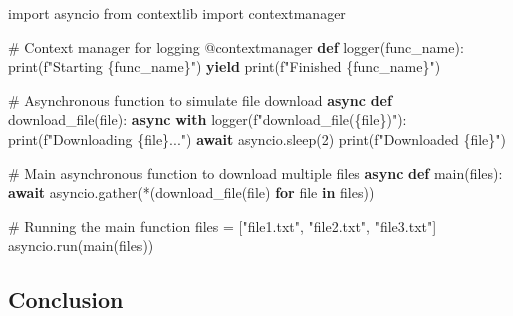 \documentclass[
  letterpaper,
  DIV=11,
  numbers=noendperiod]{scrreprt}
\newenvironment{Shaded}{\begin{snugshade}}{\end{snugshade}}
\newcommand{\AttributeTok}[1]{\textcolor[rgb]{0.40,0.45,0.13}{#1}}
\newcommand{\BuiltInTok}[1]{\textcolor[rgb]{0.00,0.23,0.31}{#1}}
\newcommand{\CommentTok}[1]{\textcolor[rgb]{0.37,0.37,0.37}{#1}}
\newcommand{\ControlFlowTok}[1]{\textcolor[rgb]{0.00,0.23,0.31}{\textbf{#1}}}
\newcommand{\DecValTok}[1]{\textcolor[rgb]{0.68,0.00,0.00}{#1}}
\newcommand{\ImportTok}[1]{\textcolor[rgb]{0.00,0.46,0.62}{#1}}
\newcommand{\KeywordTok}[1]{\textcolor[rgb]{0.00,0.23,0.31}{\textbf{#1}}}
\newcommand{\NormalTok}[1]{\textcolor[rgb]{0.00,0.23,0.31}{#1}}
\newcommand{\OperatorTok}[1]{\textcolor[rgb]{0.37,0.37,0.37}{#1}}
\newcommand{\SpecialCharTok}[1]{\textcolor[rgb]{0.37,0.37,0.37}{#1}}
\newcommand{\SpecialStringTok}[1]{\textcolor[rgb]{0.13,0.47,0.30}{#1}}
\newcommand{\StringTok}[1]{\textcolor[rgb]{0.13,0.47,0.30}{#1}}
\begin{document}
\begin{Shaded}
\begin{Highlighting}[]
\ImportTok{import}\NormalTok{ asyncio}
\ImportTok{from}\NormalTok{ contextlib }\ImportTok{import}\NormalTok{ contextmanager}

\CommentTok{\# Context manager for logging}
\AttributeTok{@contextmanager}
\KeywordTok{def}\NormalTok{ logger(func\_name):}
    \BuiltInTok{print}\NormalTok{(}\SpecialStringTok{f"Starting }\SpecialCharTok{\{}\NormalTok{func\_name}\SpecialCharTok{\}}\SpecialStringTok{"}\NormalTok{)}
    \ControlFlowTok{yield}
    \BuiltInTok{print}\NormalTok{(}\SpecialStringTok{f"Finished }\SpecialCharTok{\{}\NormalTok{func\_name}\SpecialCharTok{\}}\SpecialStringTok{"}\NormalTok{)}

\CommentTok{\# Asynchronous function to simulate file download}
\ControlFlowTok{async} \KeywordTok{def}\NormalTok{ download\_file(}\BuiltInTok{file}\NormalTok{):}
    \ControlFlowTok{async} \ControlFlowTok{with}\NormalTok{ logger(}\SpecialStringTok{f"download\_file(}\SpecialCharTok{\{}\BuiltInTok{file}\SpecialCharTok{\}}\SpecialStringTok{)"}\NormalTok{):}
        \BuiltInTok{print}\NormalTok{(}\SpecialStringTok{f"Downloading }\SpecialCharTok{\{}\BuiltInTok{file}\SpecialCharTok{\}}\SpecialStringTok{..."}\NormalTok{)}
        \ControlFlowTok{await}\NormalTok{ asyncio.sleep(}\DecValTok{2}\NormalTok{)}
        \BuiltInTok{print}\NormalTok{(}\SpecialStringTok{f"Downloaded }\SpecialCharTok{\{}\BuiltInTok{file}\SpecialCharTok{\}}\SpecialStringTok{"}\NormalTok{)}

\CommentTok{\# Main asynchronous function to download multiple files}
\ControlFlowTok{async} \KeywordTok{def}\NormalTok{ main(files):}
    \ControlFlowTok{await}\NormalTok{ asyncio.gather(}\OperatorTok{*}\NormalTok{(download\_file(}\BuiltInTok{file}\NormalTok{) }\ControlFlowTok{for} \BuiltInTok{file} \KeywordTok{in}\NormalTok{ files))}

\CommentTok{\# Running the main function}
\NormalTok{files }\OperatorTok{=}\NormalTok{ [}\StringTok{"file1.txt"}\NormalTok{, }\StringTok{"file2.txt"}\NormalTok{, }\StringTok{"file3.txt"}\NormalTok{]}
\NormalTok{asyncio.run(main(files))}
\end{Highlighting}
\end{Shaded}

\subsection{Conclusion}\label{conclusion-33}
\end{document}
